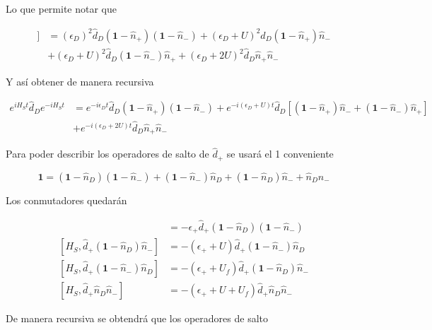 \begin{appendixs}
Lo que permite notar que

\begin{align*}
    [H_{S},[H_{S},\hat{d}_{D}]] & = (\epsilon_{D})^{2}\hat{d}_{D}(\textbf{1} - \hat{n}_{+}) (\textbf{1} - \hat{n}_{-}) + (\epsilon_{D} + U)^{2}\hat{d}_{D}(\textbf{1} - \hat{n}_{+})\hat{n}_{-} \\
        & + (\epsilon_{D}+U)^{2}\hat{d}_{D}(\textbf{1} - \hat{n}_{-})\hat{n}_{+} + (\epsilon_{D} + 2U)^{2}\hat{d}_{D}\hat{n}_{+}\hat{n}_{-}
\end{align*}

Y así obtener de manera recursiva

\begin{align*}
    e^{i H_{S}t}\hat{d}_{D}e^{-iH_{S}t}  & = e^{-i\epsilon_{D}t} \hat{d}_{D}(\textbf{1} - \hat{n}_{+}) (\textbf{1} - \hat{n}_{-}) +  e^{-i(\epsilon_{D}+U)t} \hat{d}_{D}[(\textbf{1} - \hat{n}_{+})\hat{n}_{-} + (\textbf{1} - \hat{n}_{-})\hat{n}_{+}] \\
    & + e^{-i(\epsilon_{D} + 2U)t}\hat{d}_{D} \hat{n}_{+}\hat{n}_{-}
\end{align*}

Para poder describir los operadores de salto de $\hat{d}_{+}$ se usará el 1 conveniente

\begin{equation*}
    \textbf{1} = (\textbf{1}-\hat{n}_{D})(\textbf{1}-\hat{n}_{-}) + (\textbf{1}-\hat{n}_{-})\hat{n}_{D} + (\textbf{1}-\hat{n}_{D})\hat{n}_{-} + \hat{n}_{D}\hat{n}_{-}
\end{equation*}

Los conmutadores quedarán

\begin{align*}
    [H_{S},\hat{d}_{+}(\textbf{1}-\hat{n}_{D})(\textbf{1} - \hat{n}_{-})] & = - \epsilon_{+}\hat{d}_{+}(\textbf{1}-\hat{n}_{D})(\textbf{1} - \hat{n}_{-}) \\
    [H_{S},\hat{d}_{+}(\textbf{1}-\hat{n}_{D})\hat{n}_{-}] & = - (\epsilon_{+} + U)\hat{d}_{+}(\textbf{1} - \hat{n}_{-})\hat{n}_{D} \\
    [H_{S},\hat{d}_{+}(\textbf{1}-\hat{n}_{-})\hat{n}_{D}] & = - (\epsilon_{+} + U_{f})\hat{d}_{+}(\textbf{1} - \hat{n}_{D})\hat{n}_{-} \\
    [H_{S},\hat{d}_{+}\hat{n}_{D}\hat{n}_{-}] & = - (\epsilon_{+} + U + U_{f})\hat{d}_{+}\hat{n}_{D}\hat{n}_{-} 
\end{align*}

De manera recursiva se obtendrá que los operadores de salto


\end{appendixs}
